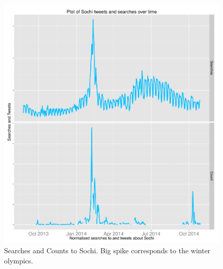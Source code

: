 \documentclass[minf,twoside,singlespacing,parskip,frontabs,notimes,12pt]{infthesis} %
\begin{document}
\begin{figure}[p!]
\begin{center}
\includegraphics[width=\textwidth]{Sochi}
\end{center}
\caption{Searches and Counts to Sochi. Big spike corresponds to the winter olympics. }
\label{sochifinalplot}
\end{figure}
\end{document}
